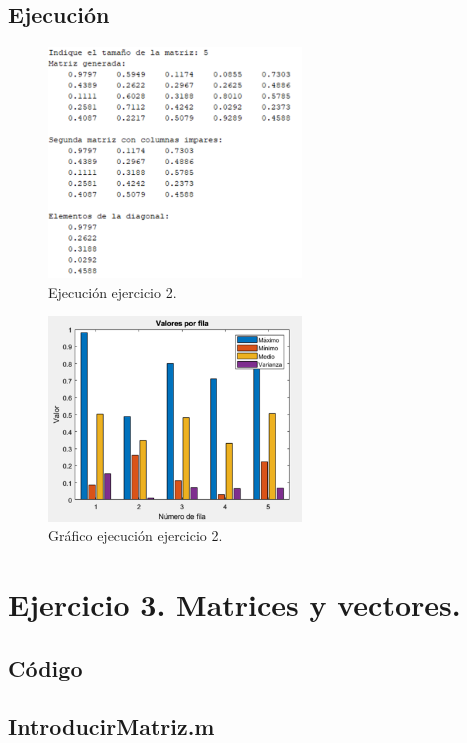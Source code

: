 \documentclass[a4paper, 12pt]{article}
\begin{document}
	\subsection{Ejecución}
	\begin{figure}[htp!]
		\centering
		\includegraphics[width=0.6\textwidth]{figures/ejc2.png}
		\caption{Ejecución ejercicio 2.}
	\end{figure}
	\begin{figure}[htp!]
		\centering
		\includegraphics[width=0.6\textwidth]{figures/graf1.png}
		\caption{Gráfico ejecución ejercicio 2.}
	\end{figure}
	
	\section{Ejercicio 3. Matrices y vectores.}
	
	\subsection{Código}
	\subsection*{IntroducirMatriz.m}
	\inputminted[fontsize=\scriptsize, linenos, breaklines=true, xleftmargin=0.75cm, frame=lines]{matlab}{code/parte1/IntroducirMatriz.m}
	\inputminted[fontsize=\scriptsize, linenos, breaklines=true, xleftmargin=0.75cm, frame=lines]{matlab}{code/parte1/Ejercicio3.m}
	\newpage
\end{document}
